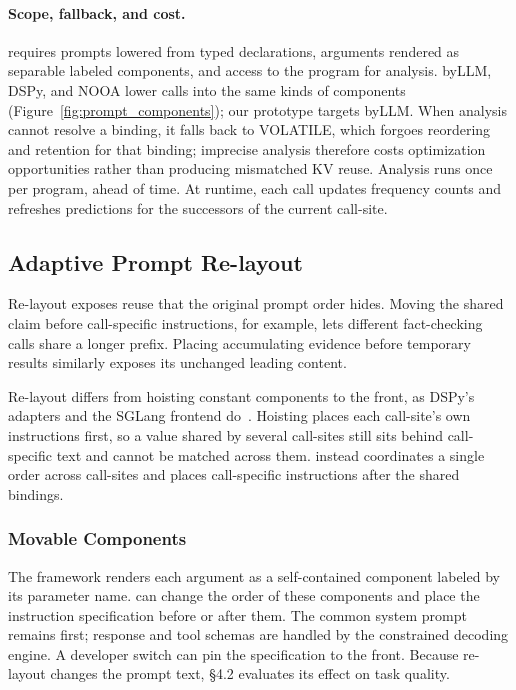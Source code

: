 \paragraph{Scope, fallback, and cost.}
\sysname requires prompts lowered from typed declarations, arguments rendered as separable labeled components, and access to the program for analysis. byLLM, DSPy, and NOOA lower calls into the same kinds of components (Figure~\ref{fig:prompt_components}); our prototype targets byLLM. %
When analysis cannot resolve a binding, it falls back to VOLATILE, which forgoes reordering and retention for that binding; imprecise analysis therefore costs optimization opportunities rather than producing mismatched KV reuse. Analysis runs once per program, ahead of time. At runtime, each call updates frequency counts and refreshes predictions for the successors of the current call-site. %

\subsection{Adaptive Prompt Re-layout}
\label{sec:relayout}

Re-layout exposes reuse that the original prompt order hides. Moving the shared claim before call-specific instructions, for example, lets different fact-checking calls share a longer prefix. Placing accumulating evidence before temporary results similarly exposes its unchanged leading content.

Re-layout differs from hoisting constant components to the front, as DSPy's adapters and the SGLang frontend do~\cite{dspy_adapter,zheng2024sglang}. %
Hoisting places each call-site's own instructions first, so a value shared by several call-sites still sits behind call-specific text and cannot be matched across them. \sysname instead coordinates a single order across call-sites and places call-specific instructions after the shared bindings.

\subsubsection{Movable Components}

The framework renders each argument as a self-contained component labeled by its parameter name. \sysname can change the order of these components and place the instruction specification before or after them. The common system prompt remains first; response and tool schemas are handled by the constrained decoding engine. A developer switch can pin the specification to the front. Because re-layout changes the prompt text, \S4.2 evaluates its effect on task quality. %

